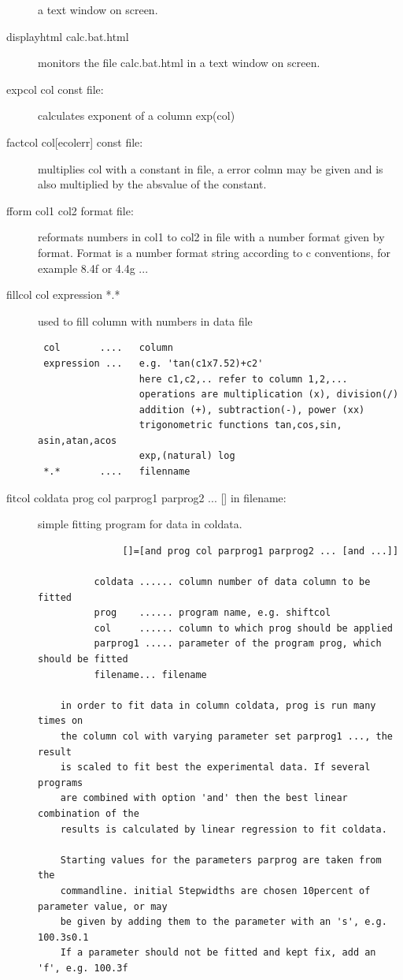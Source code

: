 \begin{description}
a text window on screen.
\item [\prg displayhtml\index{displayhtml} calc.bat.html] monitors the file calc.bat.html in 
a text window on screen.
\item [\prg expcol\index{expcol} col const file:] calculates exponent of a column exp(col) 
\item [\prg factcol\index{factcol} col{[ecolerr]} const file:] multiplies col with a constant in file,
a error colmn may be given and is also multiplied by the absvalue of the constant.
\item [\prg fform\index{fform} col1 col2 format file:] reformats numbers in col1 to col2 in file %
with
             a number format given by format. Format is a number format string according
             to c conventions, for example 8.4f or 4.4g  ...             
\item [\prg fillcol  col expression *.*\index{fillcol}]  used to fill column with numbers in data file
\begin{verbatim}
 col       ....   column
 expression ...   e.g. 'tan(c1x7.52)+c2'
                  here c1,c2,.. refer to column 1,2,...
                  operations are multiplication (x), division(/)
                  addition (+), subtraction(-), power (xx)
                  trigonometric functions tan,cos,sin, asin,atan,acos
                  exp,(natural) log
 *.*       ....   filenname
\end{verbatim}
\item [\prg fitcol coldata prog col parprog1 parprog2 ... {[]} in filename:]
simple fitting program for data in coldata.
\begin{verbatim}
               []=[and prog col parprog1 parprog2 ... [and ...]]

          coldata ...... column number of data column to be fitted
          prog    ...... program name, e.g. shiftcol
          col     ...... column to which prog should be applied
          parprog1 ..... parameter of the program prog, which should be fitted
          filename... filename

    in order to fit data in column coldata, prog is run many times on
    the column col with varying parameter set parprog1 ..., the result
    is scaled to fit best the experimental data. If several programs
    are combined with option 'and' then the best linear combination of the
    results is calculated by linear regression to fit coldata.

    Starting values for the parameters parprog are taken from the
    commandline. initial Stepwidths are chosen 10percent of parameter value, or may
    be given by adding them to the parameter with an 's', e.g. 100.3s0.1
    If a parameter should not be fitted and kept fix, add an 'f', e.g. 100.3f


\end{verbatim}
\end{description}
